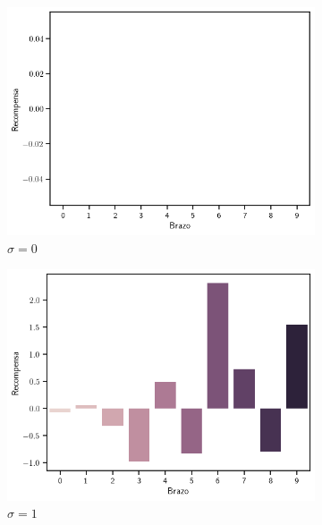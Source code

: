 \documentclass[12pt]{article}
\begin{document}
    \begin{figure}[h]
        \centering
        \begin{subfigure}[H]{0.45\textwidth}
            \includegraphics[width=\textwidth]{../img/rewards_sigma_0}
            \caption{$\sigma=0$}
            \label{fig:rewards_0}
        \end{subfigure}
        \begin{subfigure}[H]{0.45\textwidth}
            \includegraphics[width=\textwidth]{../img/rewards_sigma_1}
            \caption{$\sigma=1$}
            \label{fig:rewards_1}
        \end{subfigure}
        \begin{subfigure}[H]{0.45\textwidth}

\end{subfigure}
\end{figure}
\end{document}
